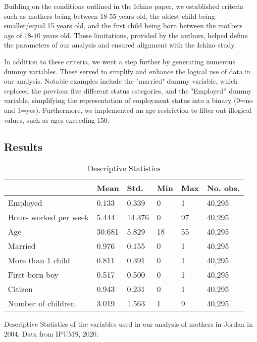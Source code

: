 \documentclass[12pt,draft,a4paper]{article}
\begin{document}
Building on the conditions outlined in the Ichino paper, we established criteria such as mothers being between 18-55 years old, the oldest child being smaller/equal 15 years old, and the first child being born between the mothers age of 18-40 years old. These limitations, provided by the authors, helped define the parameters of our analysis and ensured alignment with the Ichino study.

In addition to these criteria, we went a step further by generating numerous dummy variables. These served to simplify and enhance the logical use of data in our analysis. Notable examples include the "married" dummy variable, which replaced the previous five different status categories, and the "Employed” dummy variable, simplifying the representation of employment status into a binary (0=no and 1=yes). Furthermore, we implemented an age restriction to filter out illogical values, such as ages exceeding 150.


\subsection{Results}

\begin{table}[ht]
    \caption{Descriptive Statistics}
    \begin{tabularx}{\textwidth}{lXXXXX}
    \hline
                          & Mean   & Std.   & Min & Max & No. obs. \\ \hline
    Employed              & 0.133  & 0.339  & 0   & 1   & 40,295   \\
    Hours worked per week & 5.444  & 14.376 & 0   & 97  & 40,295   \\
    Age                   & 30.681 & 5.829  & 18  & 55  & 40,295   \\
    Married               & 0.976  & 0.155  & 0   & 1   & 40,295   \\
    More than 1 child     & 0.811  & 0.391  & 0   & 1   & 40,295   \\
    First-born boy        & 0.517  & 0.500  & 0   & 1   & 40,295   \\
    Citizen               & 0.943  & 0.231  & 0   & 1   & 40,295   \\
    Number of children    & 3.019  & 1.563  & 1   & 9   & 40,295   \\ \hline
    \end{tabularx}%

    Descriptive Statistics of the variables used in our analysis of mothers in Jordan in 2004. Data from IPUMS, 2020.
    \label{tab:desc}
    \end{table}
\end{document}

